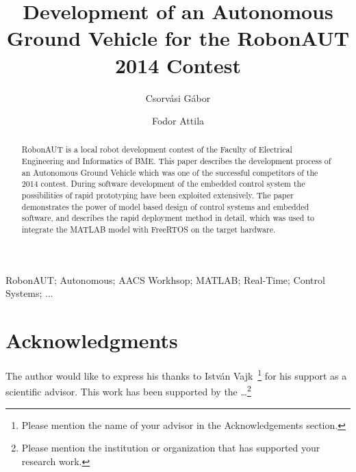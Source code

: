 \documentclass[twoside,b5paper,10pt]{article}
\title{Development of an Autonomous Ground Vehicle for the RobonAUT 2014 Contest}
\author{Csorvási Gábor \and Fodor Attila}
\begin{document}
\makeAutStyleTitle


\begin{abstract}
RobonAUT is a local robot development contest of the Faculty of Electrical Engineering and Informatics of BME. This paper describes the development process of an Autonomous Ground Vehicle which was one of the successful competitors of the 2014 contest. During software development of the embedded control system the possibilities of rapid prototyping have been exploited extensively. The paper demonstrates the power of model based design of control systems and embedded software, and describes the rapid deployment method in detail, which was used to integrate the MATLAB model with FreeRTOS on the target hardware.
\end{abstract}


\begin{keywords}
RobonAUT; Autonomous; AACS Workhsop; MATLAB; Real-Time; Control Systems; ...
\end{keywords}







\section*{Acknowledgments}
 { \small The author would like to express his thanks to István Vajk~\footnote{Please mention the name of your advisor in the
Acknowledgements section. } for his support as a scientific advisor.
This work has been supported by the \dots \footnote{Please mention
the institution or organization that has supported your research
work.} }

\end{document}
